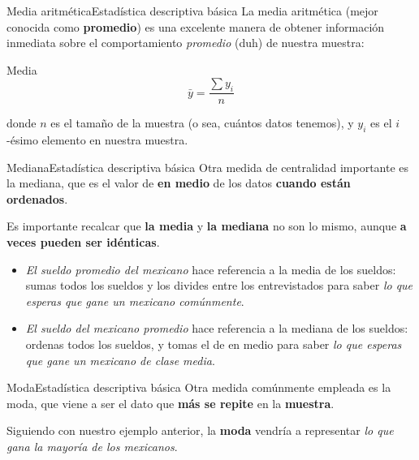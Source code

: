 \documentclass[spanish, c, dvipsnames]{beamer}
\begin{document}
\begin{frame}{Media aritmética}{Estadística descriptiva básica}
    La \alert{media aritmética} (mejor conocida como \textbf{promedio}) es una excelente manera de obtener información inmediata sobre el comportamiento \textit{promedio} (duh) de nuestra muestra:

    \bigskip

    \begin{block}{Media}
        $$\bar{y} = \frac{\sum y_i}{n}$$
    \end{block}

    \bigskip

    donde $n$ es el \alert{tamaño de la muestra} (o sea, cuántos datos tenemos), y $y_i$ es el $i$-ésimo elemento en nuestra muestra.
\end{frame}

\begin{frame}{Mediana}{Estadística descriptiva básica}
    Otra medida de centralidad importante es la \alert{mediana}, que es el valor de \textbf{en medio} de los datos \textbf{cuando están ordenados}. \pause

    \bigskip

    Es importante recalcar que \textbf{la media} y \textbf{la mediana} \alert{no son lo mismo}, aunque \textbf{a veces pueden ser idénticas}. \pause

    \bigskip

    \begin{itemize}[<+->]
        \itemsep2ex
        \item \textit{El sueldo promedio del mexicano} hace referencia a la \alert{media} de los sueldos: sumas todos los sueldos y los divides entre los entrevistados para saber \textit{lo que esperas que gane un mexicano comúnmente}.
        \item \textit{El sueldo del mexicano promedio} hace referencia a la \alert{mediana} de los sueldos: ordenas todos los sueldos, y tomas el de en medio para saber \textit{lo que esperas que gane un mexicano de clase media}.
    \end{itemize}
\end{frame}

\begin{frame}{Moda}{Estadística descriptiva básica}
    Otra medida comúnmente empleada es la \alert{moda}, que viene a ser el dato que \textbf{más se repite} en la \textbf{muestra}. \pause

    \bigskip

    Siguiendo con nuestro ejemplo anterior, la \textbf{moda} vendría a representar \textit{lo que gana la mayoría de los mexicanos}.
\end{frame}
\end{document}
